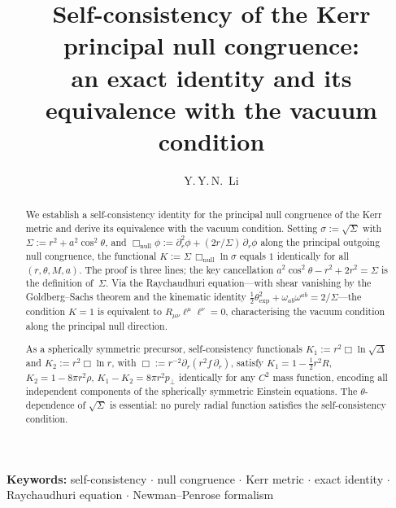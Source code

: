 \documentclass{iopart}
\begin{document}
\title{\textbf{Self-consistency of the Kerr principal null congruence:\\
an exact identity and its equivalence with the vacuum condition}}

\author{Y.\,Y.\,N.\ Li}
\address{Independent Researcher}

\maketitle

\begin{abstract}
We establish a self-consistency identity for the principal null
congruence of the Kerr metric and derive its equivalence with the
vacuum condition.
Setting $\sigma:=\sqrt{\Sigma}$ with $\Sigma:=r^2+a^2\cos^2\!\theta$,
and $\Box_{\mathrm{null}}\phi:=\partial_r^2\phi+(2r/\Sigma)\,\partial_r\phi$
along the principal outgoing null congruence, the functional
$K:=\Sigma\,\Box_{\mathrm{null}}\ln\sigma$ equals $1$ identically
for all $(r,\theta,M,a)$.
The proof is three lines; the key cancellation
$a^2\cos^2\!\theta-r^2+2r^2=\Sigma$ is the definition of~$\Sigma$.
Via the Raychaudhuri equation---with shear vanishing by the
Goldberg--Sachs theorem and the kinematic identity
$\tfrac{1}{2}\theta_{\mathrm{exp}}^2+\omega_{ab}\omega^{ab}=2/\Sigma$---the
condition $K{=}1$ is equivalent to
$R_{\mu\nu}\ell^\mu\ell^\nu=0$, characterising the vacuum condition
along the principal null direction.

As a spherically symmetric precursor, self-consistency functionals
$K_1:=r^2\Box\ln\sqrt{\Delta}$ and $K_2:=r^2\Box\ln r$,
with $\Box:=r^{-2}\partial_r(r^2 f\,\partial_r)$, satisfy
$K_1=1-\tfrac{1}{2}r^2R$,\;$K_2=1-8\pi r^2\rho$,\;
$K_1-K_2=8\pi r^2 p_{\!\perp}$ identically for any $C^2$ mass
function, encoding all independent components of the spherically
symmetric Einstein equations.
The $\theta$-dependence of $\sqrt{\Sigma}$ is essential:
no purely radial function satisfies the self-consistency condition.
\end{abstract}

\noindent\textbf{Keywords:} self-consistency $\cdot$ null congruence
$\cdot$ Kerr metric $\cdot$ exact identity
$\cdot$ Raychaudhuri equation $\cdot$ Newman--Penrose formalism

\medskip
\end{document}
